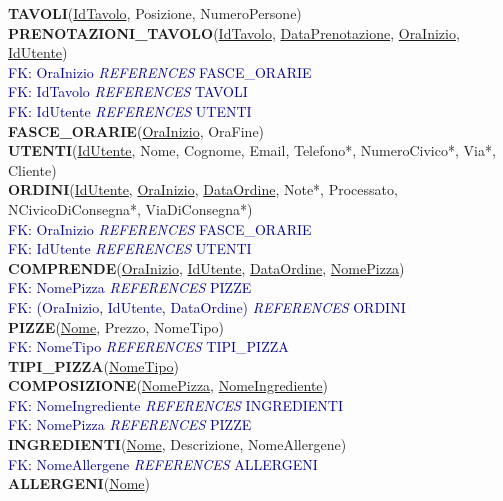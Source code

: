 \documentclass[a4paper,12pt, oneside]{article}
\begin{document}
\textbf{TAVOLI}(\underline{IdTavolo}, Posizione, NumeroPersone) \\
\textbf{PRENOTAZIONI\_TAVOLO}(\underline{IdTavolo}, \underline{DataPrenotazione}, \underline{OraInizio}, \underline{IdUtente}) \\
\textcolor{darkBlue}{FK: OraInizio \textit{REFERENCES} FASCE\_ORARIE} \\
\textcolor{darkBlue}{FK: IdTavolo \textit{REFERENCES} TAVOLI} \\
\textcolor{darkBlue}{FK: IdUtente \textit{REFERENCES} UTENTI} \\
\textbf{FASCE\_ORARIE}(\underline{OraInizio}, OraFine) \\
\textbf{UTENTI}(\underline{IdUtente}, Nome, Cognome, Email, Telefono*, NumeroCivico*, Via*, Cliente) \\
\textbf{ORDINI}(\underline{IdUtente}, \underline{OraInizio}, \underline{DataOrdine}, Note*, Processato, NCivicoDiConsegna*, ViaDiConsegna*) \\
\textcolor{darkBlue}{FK: OraInizio \textit{REFERENCES} FASCE\_ORARIE} \\
\textcolor{darkBlue}{FK: IdUtente \textit{REFERENCES} UTENTI} \\
\textbf{COMPRENDE}(\underline{OraInizio}, \underline{IdUtente}, \underline{DataOrdine}, \underline{NomePizza}) \\
\textcolor{darkBlue}{FK: NomePizza \textit{REFERENCES} PIZZE} \\
\textcolor{darkBlue}{FK: (OraInizio, IdUtente, DataOrdine) \textit{REFERENCES} ORDINI} \\
\textbf{PIZZE}(\underline{Nome}, Prezzo, NomeTipo) \\
\textcolor{darkBlue}{FK: NomeTipo \textit{REFERENCES} TIPI\_PIZZA} \\
\textbf{TIPI\_PIZZA}(\underline{NomeTipo}) \\
\textbf{COMPOSIZIONE}(\underline{NomePizza}, \underline{NomeIngrediente}) \\
\textcolor{darkBlue}{FK: NomeIngrediente \textit{REFERENCES} INGREDIENTI} \\
\textcolor{darkBlue}{FK: NomePizza \textit{REFERENCES} PIZZE} \\
\textbf{INGREDIENTI}(\underline{Nome}, Descrizione, NomeAllergene) \\
\textcolor{darkBlue}{FK: NomeAllergene \textit{REFERENCES} ALLERGENI} \\
\textbf{ALLERGENI}(\underline{Nome}) \\
\end{document}
